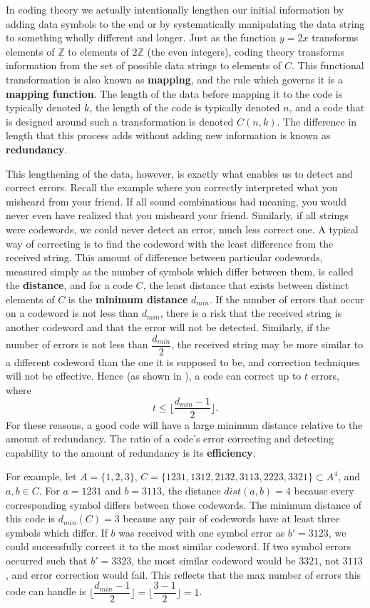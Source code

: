 \documentclass[11pt]{article}
\newcommand{\Z}{\mathbb{Z}}
\begin{document}
In coding theory we actually intentionally lengthen our initial information by adding data symbols to the end or by systematically manipulating the data string to something wholly different and longer. Just as the function $y=2x$ transforms elements of $\Z$ to elements of $2\Z$ (the even integers), coding theory transforms information from the set of possible data strings to elements of $C$. This functional transformation is also known as \textbf{mapping}, and the rule which governs it is a \textbf{mapping function}. The length of the data before mapping it to the code is typically denoted $k$, the length of the code is typically denoted $n$, and a code that is designed around such a transformation is denoted \textbf{$C(n,k)$}. The difference in length that this process adds without adding new information is known as \textbf{redundancy}.

This lengthening of the data, however, is exactly what enables us to detect and correct errors. Recall the example where you correctly interpreted what you misheard from your friend. If all sound combinations had meaning, you would never even have realized that you misheard your friend. Similarly, if all strings were codewords, we could never detect an error, much less correct one. A typical way of correcting is to find the codeword with the least difference from the received string. This amount of difference between particular codewords, measured simply as the number of symbols which differ between them, is called the \textbf{distance}, and for a code $C$, the least distance that exists between distinct elements of $C$ is the \textbf{minimum distance} $d_{min}$. If the number of errors that occur on a codeword is not less than $d_{min}$, there is a risk that the received string is another codeword and that the error will not be detected. Similarly, if the number of errors is not less than $\dfrac{d_{min}}{2}$, the received string may be more similar to a different codeword than the one it is supposed to be, and correction techniques will not be effective. Hence (as shown in \cite[2]{afcicodingtheory}), a code can correct up to $t$ errors, where
\begin{equation} \label{ecc}
t \le \lfloor\dfrac{d_{min}-1}{2}\rfloor.
\end{equation}
For these reasons, a good code will have a large minimum distance relative to the amount of redundancy. The ratio of a code's error correcting and detecting capability to the amount of redundancy is its \textbf{efficiency}.

For example, let $A=\{1,2,3\}$, $C=\{1231,1312,2132,3113,2223,3321\}\subset A^{4}$, and $a,b\in C$. For $a=1231$ and $b=3113$, the distance $dist(a,b)=4$ because every corresponding symbol differs between those codewords. The minimum distance of this code is $d_{min}(C)=3$ because any pair of codewords have at least three symbols which differ. If $b$ was received with one symbol error as $b'=3123$, we could successfully correct it to the most similar codeword. If two symbol errors occurred such that $b'=3323$, the most similar codeword would be $3321$, not $3113$, and error correction would fail. This reflects that the max number of errors this code can handle is $\lfloor\dfrac{d_{min}-1}{2}\rfloor=\lfloor\dfrac{3-1}{2}\rfloor=1$.
\end{document}
